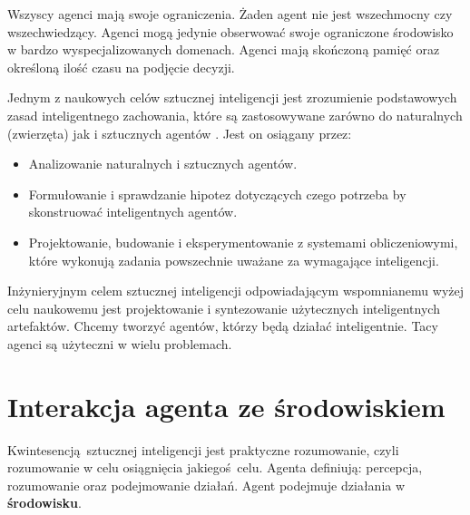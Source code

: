 \documentclass[a4paper, 12pt,oneside]{book}
\begin{document}
Wszyscy agenci mają swoje ograniczenia. Żaden agent nie jest wszechmocny czy 
wszechwiedzący. Agenci mogą jedynie obserwować swoje ograniczone środowisko
w bardzo wyspecjalizowanych domenach. Agenci mają skończoną pamięć oraz
określoną ilość czasu na podjęcie decyzji.

Jednym z naukowych celów sztucznej inteligencji jest zrozumienie podstawowych
zasad inteligentnego zachowania, które są zastosowywane zarówno do
naturalnych (zwierzęta) jak i sztucznych
agentów \cite{ai_foundations_scientific_goal}.
Jest on osiągany przez:
\begin{itemize}
	\setlength\itemsep{-0.4em}
	\item Analizowanie naturalnych i sztucznych agentów.
	\item Formułowanie i sprawdzanie hipotez dotyczących czego potrzeba
		by skonstruować inteligentnych agentów.
	\item Projektowanie, budowanie  i eksperymentowanie z systemami
		obliczeniowymi, które wykonują zadania powszechnie uważane
		za wymagające inteligencji.
\end{itemize}
Inżynieryjnym celem sztucznej inteligencji odpowiadającym wspomnianemu wyżej
celu naukowemu jest projektowanie i syntezowanie
użytecznych inteligentnych artefaktów. Chcemy tworzyć agentów, którzy będą
działać inteligentnie. Tacy agenci są użyteczni w wielu problemach.

\section{Interakcja agenta  ze środowiskiem}
Kwintesencją sztucznej inteligencji jest praktyczne rozumowanie, czyli
rozumowanie w celu osiągnięcia jakiegoś celu. Agenta definiują:
percepcja, rozumowanie oraz podejmowanie działań. Agent podejmuje działania w
\textbf{środowisku}.
\end{document}
